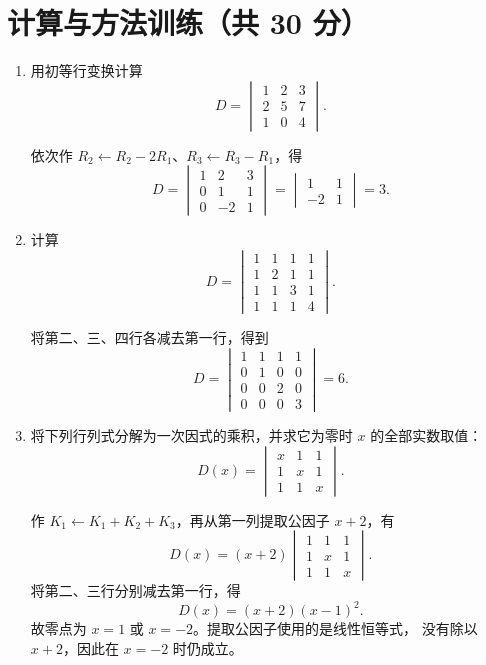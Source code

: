 \documentclass[UTF8,12pt,a4paper,fontset=fandol]{ctexart}
\begin{document}
\section{计算与方法训练（共 30 分）}
\begin{enumerate}[label=\arabic*.,resume=detquestions]

\item\label{q:numeric-three}
用初等行变换计算
\[
D=\begin{vmatrix}1&2&3\\2&5&7\\1&0&4\end{vmatrix}.
\]
\begin{solve}
依次作 $R_2\leftarrow R_2-2R_1$、$R_3\leftarrow R_3-R_1$，得
\[
D=\begin{vmatrix}1&2&3\\0&1&1\\0&-2&1\end{vmatrix}
=\begin{vmatrix}1&1\\-2&1\end{vmatrix}=3.
\]
\end{solve}

\item\label{q:numeric-four}
计算
\[
D=\begin{vmatrix}
1&1&1&1\\1&2&1&1\\1&1&3&1\\1&1&1&4
\end{vmatrix}.
\]
\begin{solve}
将第二、三、四行各减去第一行，得到
\[
D=\begin{vmatrix}
1&1&1&1\\0&1&0&0\\0&0&2&0\\0&0&0&3
\end{vmatrix}=6.
\]
\end{solve}

\item\label{q:parameter-three}
将下列行列式分解为一次因式的乘积，并求它为零时 $x$ 的全部实数取值：
\[
D(x)=\begin{vmatrix}x&1&1\\1&x&1\\1&1&x\end{vmatrix}.
\]
\begin{solve}
作 $K_1\leftarrow K_1+K_2+K_3$，再从第一列提取公因子 $x+2$，有
\[
D(x)=(x+2)\begin{vmatrix}1&1&1\\1&x&1\\1&1&x\end{vmatrix}.
\]
将第二、三行分别减去第一行，得
\[
D(x)=(x+2)(x-1)^2.
\]
故零点为 $x=1$ 或 $x=-2$。提取公因子使用的是线性恒等式，
没有除以 $x+2$，因此在 $x=-2$ 时仍成立。
\end{solve}


\end{enumerate}
\end{document}
